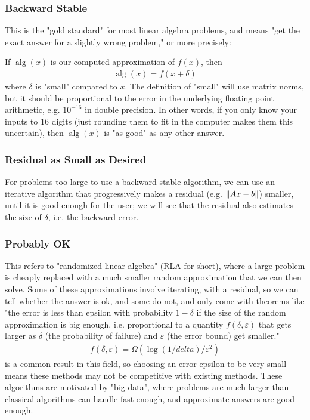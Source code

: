 \documentclass[11pt]{article}
\numberwithin{equation}{section}
\begin{document}
\subsubsection{Backward Stable}
This is the "gold standard" for most linear algebra problems, and means "get the exact answer for a slightly wrong problem," or more precisely:

If $\operatorname{alg}(x)$ is our computed approximation of $f(x)$, then
\begin{align*}
    \operatorname{alg}(x) = f(x + \delta)
\end{align*}
where $\delta$ is "small" compared to $x$. The definition of "small" will use matrix norms, 
but it should be proportional to the error in the underlying floating point arithmetic, e.g. $10^{-16}$ in double precision. In other words, 
if you only know your inputs to 16 digits (just rounding them to fit in the computer makes them this uncertain), 
then $\operatorname{alg}(x)$ is "as good" as any other answer.

\subsubsection{Residual as Small as Desired}
For problems too large to use a backward stable algorithm, we can use an iterative algorithm that progressively makes a residual (e.g. $\left\| Ax-b \right\|$) smaller,
until it is good enough for the user; we will see that the residual also estimates the size of $\delta$, i.e. the backward error.

\subsubsection{Probably OK}
This refers to "randomized linear algebra" (RLA for short), where a large problem is cheaply replaced with a much smaller random approximation 
that we can then solve. Some of these approximations involve iterating, with a residual, so we can tell whether the answer is ok, and some do not,
and only come with theorems like "the error is less than epsilon with probability $1 - \delta$ if the size of the random approximation is big enough, 
i.e. proportional to a quantity $f(\delta, \varepsilon)$ that gets larger as $\delta$ (the probability of failure) and $\varepsilon$ (the error bound) get smaller."
\begin{align*}
    f(\delta, \varepsilon) = \Omega(\log(1/delta)/\varepsilon^2)
\end{align*}
is a common result in this field, so choosing an error epsilon to be very small means these methods may not be competitive with existing methods. 
These algorithms are motivated by "big data", where problems are much larger than classical algorithms can handle fast enough, 
and approximate answers are good enough.
\end{document}
